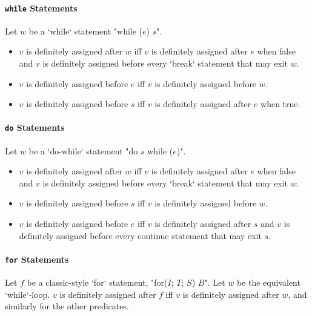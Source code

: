 \paragraph{ {\tt while}  Statements}
Let $w$ be a \xcd`while` statement  \xcdmath"while ($e$) $s$".  

\begin{itemize}    \item $v$ is definitely assigned after $w$ iff $v$ is definitely assigned after $e$ when false and $v$ is definitely
assigned before every \xcd`break` statement that may exit $w$.
    \item $v$ is definitely assigned before $e$ iff $v$ is definitely assigned
          before $w$.
    \item $v$ is definitely assigned before $s$ iff $v$ is definitely assigned after $e$ when true. 
\end{itemize}

\paragraph{ {\tt do} Statements}
Let $w$ be a \xcd`do-while` statement  \xcdmath"do $s$ while ($e$)".  

\begin{itemize}
    \item $v$ is definitely assigned after $w$ iff $v$ is definitely assigned
          after $e$ when false and $v$ is definitely assigned before every
          \xcd`break` statement that may exit $w$.
    \item $v$ is definitely assigned before $s$ iff $v$ is definitely assigned before $w$.
    \item $v$ is definitely assigned before $e$ iff $v$ is definitely assigned after $s$ and $v$ is definitely assigned before every continue statement that may exit $s$.
\end{itemize}

\paragraph{ {\tt for} Statements}


Let $f$ be a classic-style \xcd`for` statement, 
\xcdmath"for($I$; $T$; $S$) $B$".  
Let $w$ be the equivalent \xcd`while`-loop.  
$v$ is definitely assigned after $f$ iff $v$ is definitely assigned after $w$,
and similarly for the other predicates. 

